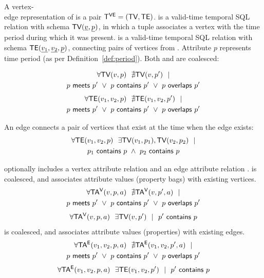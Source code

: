 \begin{definition}
A vertex-\\edge representation of \tg is a pair $\mathsf{T^{VE}}=(\textsf{TV}, \textsf{TE})$. \tv
is a valid-time temporal SQL relation with schema $\textsf{TV}(\underline{v},
\underline{p})$, in which a tuple associates a vertex with the time
period during which it was present. \te is a valid-time temporal SQL
relation with schema $\textsf{TE}(\underline{v_1}, \underline{v_2},
\underline{p})$, connecting pairs of vertices from \tv.  Attribute $p$
represents time period (as per Definition~\ref{def:period}).  Both \tv
and \te are coalesced:

\begin{multline}
\forall \textsf{TV}(v, p)~~\nexists \textsf{TV}(v, p')~~| \\
                       p~\mathsf{meets}~p'~\lor~p~\mathsf{contains}~p'~\lor~p~\mathsf{overlaps}~p'
\label{def:tg:c2}
\end{multline}
\vspace{-0.5cm}
\begin{multline}
\forall \textsf{TE}(v_1, v_2, p)~~\nexists \textsf{TE}(v_1,v_2, p')~~| \\
                       p~\mathsf{meets}~p'~\lor~p~\mathsf{contains}~p'~\lor~p~\mathsf{overlaps}~p'
\label{def:tg:c3}
\end{multline}

An edge connects a pair of vertices that exist at the time when the edge exists:
\begin{multline}
\forall \textsf{TE}(v_1, v_2, p)~~\exists \textsf{TV}(v_1, p_1), \textsf{TV}(v_2, p_2)~~| \\
                       p_1~\mathsf{contains}~p~\wedge~p_2~\mathsf{contains}~p
\label{def:tg:c1}
\end{multline}
\vspace{-0.5cm}

 optionally includes a vertex attribute relation \tav and an
edge attribute relation \tae.  \tav is coalesced, and associates
attribute values (property bags) with existing vertices.
\begin{multline}
\forall \mathsf{TA^{V}}(v, p, a)~~\nexists \mathsf{TA^{V}}(v, p', a)~~| \\
                       p~\mathsf{meets}~p'~\lor~p~\mathsf{contains}~p'~\lor~p~\mathsf{overlaps}~p'
\label{def:tg:c4}
\end{multline}
\begin{multline}
\forall \mathsf{TA^{V}}(v, p, a)~~\exists \textsf{TV}(v,p')~~|~~p'~\mathsf{contains}~p
\label{def:tg:c5}
\end{multline}
\tae is coalesced, and associates attribute values (properties) with
existing edges.
\begin{multline}
\forall \mathsf{TA^{E}}(v_1, v_2, p, a)~~\nexists \mathsf{TA^{E}}(v_1, v_2, p', a)~~| \\
                       p~\mathsf{meets}~p'~\lor~p~\mathsf{contains}~p'~\lor~p~\mathsf{overlaps}~p'
\label{def:tg:c6}
\end{multline}
\begin{multline}
\forall \mathsf{TA^{E}}(v_1, v_2, p, a)~~\exists \textsf{TE}(v_1,v_2,p')~~|~~p'~\mathsf{contains}~p
\label{def:tg:c7}
\end{multline}

\label{def:tg}
\end{definition}

